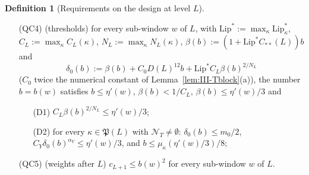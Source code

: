 \documentclass[10pt]{amsart}
\theoremstyle{definition}
\newtheorem{definition}[theorem]{Definition}
\theoremstyle{remark}
\begin{document}
\begin{definition}[Requirements on the design at level $L$]
\begin{enumerate}
$C_{**}(L):=\mathrm{Des}(L)^3$; for $L\ge l_f$ the closing moves change the
active ratio vector (in the Euclidean norm) and every status of a coarse
carrier by at most $C_{**}(L)b$ (Step~0 of the proof of
Proposition~\ref{prop:III-KNtr});
\item[(QC4)] \textup{(thresholds)} for every sub-window $w$ of $L$, with
$\mathrm{Lip}^*:=\max_\kappa\mathrm{Lip}^*_\kappa$, $C_L:=\max_\kappa C_L(\kappa)$,
$N_L:=\max_\kappa N_L(\kappa)$, $\beta(b):=(1+\mathrm{Lip}^*C_{**}(L))b$ and
\[
 \delta_0(b):=\beta(b)+C_0D(L)^{12}b+\mathrm{Lip}^*C_L\beta(b)^{2/N_L}
\]
($C_0$ twice the numerical constant of Lemma~\ref{lem:III-Tblock}(a)), the
number $b=b(w)$ satisfies $b\le\eta'(w)$, $\beta(b)<1/C_L$,
$\beta(b)\le\eta'(w)/3$ and
\begin{enumerate}
\item[(D1)] $C_L\beta(b)^{2/N_L}\le\eta'(w)/3$;
\item[(D2)] for every $\kappa\in\mathfrak P(L)$ with $\mathcal N_T\ne\emptyset$:
$\delta_0(b)\le m_0/2$, $C_Y\delta_0(b)^{\alpha_Y}\le\eta'(w)/3$, and $b\le
\mu_\kappa(\eta'(w)/3)/8$;
\end{enumerate}
\item[(QC5)] \textup{(weights after $L$)} $c_{L+1}\le b(w)^2$ for every
sub-window $w$ of $L$.
\end{enumerate}
\end{definition}
\end{document}
